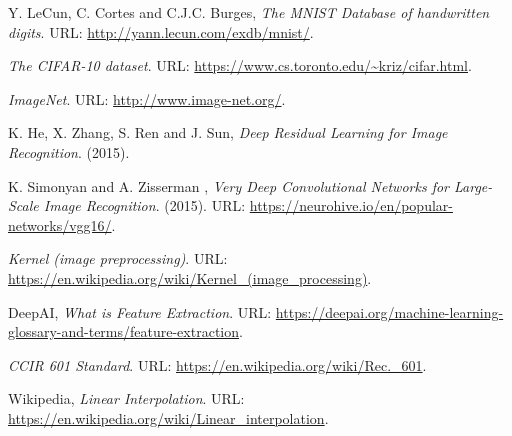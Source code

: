 

\begin{thebibliography}{3}
\frenchspacing




Y. LeCun, C. Cortes and C.J.C. Burges,
\emph{The MNIST Database of handwritten digits}.
URL: \url{http://yann.lecun.com/exdb/mnist/}.


\emph{The CIFAR-10 dataset}.
URL: \url{https://www.cs.toronto.edu/~kriz/cifar.html}.

\emph{ImageNet}.
URL: \url{http://www.image-net.org/}.


K. He, X. Zhang, S. Ren and J. Sun,
\emph{Deep Residual Learning for Image Recognition}.
(2015).


K. Simonyan and A. Zisserman
, \emph{Very Deep Convolutional Networks for Large-Scale Image Recognition}.
(2015).
URL: \url{https://neurohive.io/en/popular-networks/vgg16/}.



\emph{Kernel (image preprocessing)}.
URL: \url{https://en.wikipedia.org/wiki/Kernel_(image_processing)}.


DeepAI,
\emph{What is Feature Extraction}.
URL: \url{https://deepai.org/machine-learning-glossary-and-terms/feature-extraction}.


\emph{CCIR 601 Standard}.
URL: \url{https://en.wikipedia.org/wiki/Rec._601}.

Wikipedia,
\emph{Linear Interpolation}.
URL: \url{https://en.wikipedia.org/wiki/Linear_interpolation}.



\end{thebibliography}

